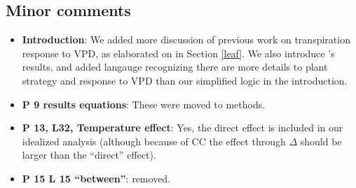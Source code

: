 \documentclass[12pt]{article}
\begin{document}
\subsection{Minor comments}

\begin{itemize}
  \item \textbf{Introduction}: We added more discussion of previous
    work on transpiration response to VPD, as elaborated on in Section
    \ref{leaf}. We also introduce \cite{Novick_2016}'s results, and
    added langauge recognizing there are more details to plant strategy
    and response to VPD than our simplified logic in the introduction.
  \item \textbf{P 9 results equations}: These were moved to methods.
  \item \textbf{P 13, L32, Temperature effect}: Yes, the direct effect is
    included in our idealized analysis (although because of CC the
    effect through $\Delta$ should be larger than the ``direct''
    effect).
  \item \textbf{P 15 L 15 ``between''}: removed.
\end{itemize}


\end{document}
